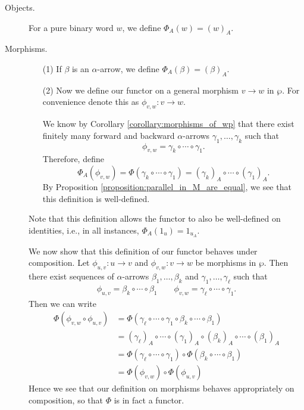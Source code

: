 \begin{description}
    \item[Objects.] 
    For a pure binary word $w$, we define $\Phi_A(w) = (w)_A$.

    \item[Morphisms.] 
    \begin{itemize}
        \item[(1)] If $\beta$ is an $\alpha$-arrow, we define 
        $\Phi_A(\beta) = (\beta)_A$. 
        
        \item[(2)] 
        Now we define our functor on a general morphism $v \to w$ in $\wp$. For convenience 
        denote this as $\phi_{v,w}: v \to w$. 
        
        We know by 
        Corollary \ref{corollary:morphisms_of_wp} that there exist finitely many 
        forward and backward $\alpha$-arrows $\gamma_1, \dots, \gamma_k$ such  that 
        \[
            \phi_{v,w} = \gamma_k \circ \cdots \circ \gamma_1. 
        \]
        Therefore, define 
        \[
            \Phi_A(\phi_{v,w}) = \Phi(\gamma_k \circ \cdots \circ \gamma_1)= (\gamma_k)_A \circ \cdots \circ (\gamma_1)_A.
        \]
        By Proposition \ref{proposition:parallel_in_M_are_equal}, we see that 
        this definition is well-defined.  
    \end{itemize}
    Note that this definition allows the functor to also be well-defined 
    on identities, i.e., in all instances, $\Phi_A(1_u) = 1_{u_A}$.

    We now show that this definition of our functor behaves under composition.
    Let $\phi_{u,v}: u \to v$ and $\phi_{v,w}: v \to w$ be morphisms in 
    $\wp$. Then there exist sequences of $\alpha$-arrows 
    $\beta_1, \dots, \beta_k$ and $\gamma_1, \dots, \gamma_{\ell}$ 
    such that 
    \begin{gather*}
        \phi_{u,v}= \beta_k \circ \cdots \circ \beta_1 \qquad
        \phi_{v,w} = \gamma_{\ell} \circ \cdots \circ \gamma_1.
    \end{gather*}
    Then we can write 
    \begin{align*}
        \Phi(\phi_{v,w} \circ \phi_{u,v}) &= \Phi(\gamma_{\ell} \circ \cdots \circ \gamma_1 \circ \beta_k \circ \cdots \circ \beta_1)\\
        &= (\gamma_{\ell})_A \circ \cdots \circ (\gamma_1)_A \circ (\beta_k)_A \circ \cdots \circ (\beta_1)_A\\
        &= \Phi(\gamma_{\ell} \circ \cdots \circ \gamma_1) \circ \Phi(\beta_k \circ \cdots \circ \beta_1)\\
        &= \Phi(\phi_{v,w}) \circ \Phi(\phi_{u,v})
    \end{align*}
    Hence we see that our definition on morphisms behaves appropriately on composition, 
    so that $\Phi$ is in fact a functor. 
\end{description}

